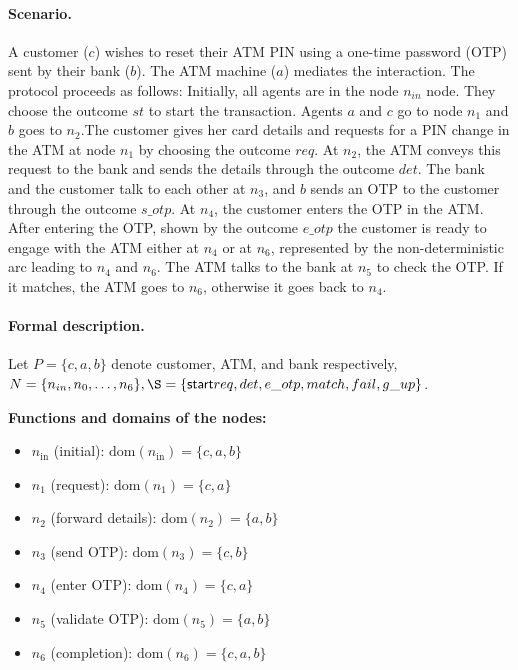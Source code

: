 \paragraph{Scenario.} A customer ($c$) wishes to reset their ATM PIN using a one-time password (OTP) sent by their bank ($b$). The ATM machine ($a$) mediates the interaction. The protocol proceeds as follows: Initially, all agents are in the node $n_{in}$ node. They choose the outcome $st$ to start the transaction. Agents $a$ and $c$ go to node $n_1$ and $b$ goes to $n_2$.The customer gives her card details and requests for a PIN change in the ATM at  node $n_1$ by choosing the outcome $req$. At $n_2$, the ATM conveys this request to the bank and sends the details through the outcome $det$. The bank and the customer talk to each other at $n_3$, and $b$ sends an OTP to the customer through the outcome $s\_otp$. At $n_4$, the customer enters the OTP in the ATM. After entering the OTP, shown by the outcome $e\_otp$ the customer is ready to engage with the ATM either at $n_4$ or at $n_6$, represented by the non-deterministic arc leading to $n_4$ and $n_6$. The ATM talks to the bank at $n_5$ to check the OTP. If it matches, the ATM goes to $n_6$, otherwise it goes back to $n_4$.

\paragraph{Formal description.}
Let $P = \{c, a, b\}$ denote customer, ATM, and bank respectively, $N = \{n_{in}, n_0, \dots, n_6\}, \S = \{\mathsf{start} req, det, e\_otp, match, fail, g\_up\}$.

\textbf{Functions and domains of the nodes:}
\begin{itemize}
\item $n_{\text{in}}$ (initial): $\text{dom}(n_{\text{in}}) = \{c,a,b\}$
\item $n_1$ (request): $\text{dom}(n_1) = \{c,a\}$
\item $n_2$ (forward details): $\text{dom}(n_2) = \{a,b\}$
\item $n_3$ (send OTP): $\text{dom}(n_3) = \{c,b\}$
\item $n_4$ (enter OTP): $\text{dom}(n_4) = \{c,a\}$
\item $n_5$ (validate OTP): $\text{dom}(n_5) = \{a,b\}$
\item $n_6$ (completion): $\text{dom}(n_6) = \{c,a,b\}$
\end{itemize}

